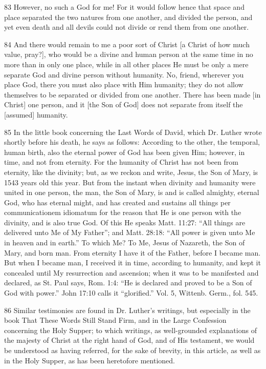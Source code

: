 {83 However, no such a God for me! For it would follow hence that space and place separated the two natures from one another, and divided the person, and yet even death and all devils could not divide or rend them from one another.

84 And there would remain to me a poor sort of Christ [a Christ of how much value, pray?], who would be a divine and human person at the same time in no more than in only one place, while in all other places He must be only a mere separate God and divine person without humanity. No, friend, wherever you place God, there you must also place with Him humanity; they do not allow themselves to be separated or divided from one another. There has been made [in Christ] one person, and it [the Son of God] does not separate from itself the [assumed] humanity.

85 In the little book concerning the Last Words of David, which Dr. Luther wrote shortly before his death, he says as follows: According to the other, the temporal, human birth, also the eternal power of God has been given Him; however, in time, and not from eternity. For the humanity of Christ has not been from eternity, like the divinity; but, as we reckon and write, Jesus, the Son of Mary, is 1543 years old this year. But from the instant when divinity and humanity were united in one person, the man, the Son of Mary, is and is called almighty, eternal God, who has eternal might, and has created and sustains all things per communicationem idiomatum for the reason that He is one person with the divinity, and is also true God. Of this He speaks Matt. 11:27: “All things are delivered unto Me of My Father”; and Matt. 28:18: “All power is given unto Me in heaven and in earth.” To which Me? To Me, Jesus of Nazareth, the Son of Mary, and born man. From eternity I have it of the Father, before I became man. But when I became man, I received it in time, according to humanity, and kept it concealed until My resurrection and ascension; when it was to be manifested and declared, as St. Paul says, Rom. 1:4: “He is declared and proved to be a Son of God with power.” John 17:10 calls it “glorified.” Vol. 5, Wittenb. Germ., fol. 545.

86 Similar testimonies are found in Dr. Luther’s writings, but especially in the book That These Words Still Stand Firm, and in the Large Confession concerning the Holy Supper; to which writings, as well-grounded explanations of the majesty of Christ at the right hand of God, and of His testament, we would be understood as having referred, for the sake of brevity, in this article, as well as in the Holy Supper, as has been heretofore mentioned.

}
